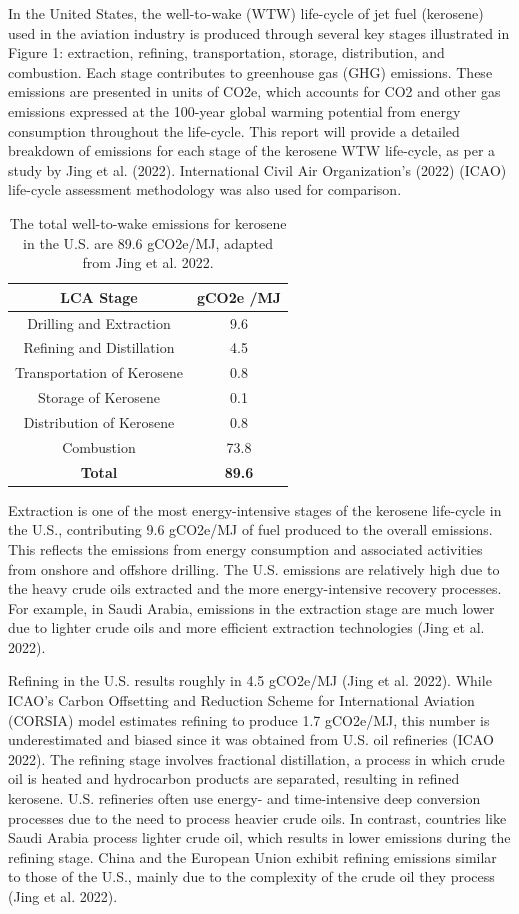 \documentclass[12pt]{article}
\begin{document}
\begin{Appendix}
In the United States, the well-to-wake (WTW) life-cycle of jet fuel (kerosene) used in the aviation industry is produced through several key stages illustrated in Figure 1: extraction, refining, transportation, storage, distribution, and combustion. Each stage contributes to greenhouse gas (GHG) emissions. These emissions are presented in units of CO2e, which accounts for CO2 and other gas emissions expressed at the 100-year global warming potential from energy consumption throughout the life-cycle. This report will provide a detailed breakdown of emissions for each stage of the kerosene WTW life-cycle, as per a study by Jing et al. (2022). International Civil Air Organization’s (2022) (ICAO) life-cycle assessment methodology was also used for comparison. 
\begin{table}[h!]
\centering
\begin{tabular}{|c|c|}
\hline
\textbf{LCA Stage} & \textbf{gCO2e /MJ} \\
\hline
Drilling and Extraction & 9.6 \\
Refining and Distillation & 4.5 \\
Transportation of Kerosene & 0.8 \\
Storage of Kerosene & 0.1 \\
Distribution of Kerosene & 0.8 \\
Combustion & 73.8 \\
\hline
\textbf{Total} & \textbf{89.6} \\
\hline
\end{tabular}
\caption{The total well-to-wake emissions for kerosene in the U.S. are 89.6 gCO2e/MJ, adapted from Jing et al. 2022.}
\label{tab:kerosene_emissions}
\end{table}

Extraction is one of the most energy-intensive stages of the kerosene life-cycle in the U.S., contributing 9.6 gCO2e/MJ of fuel produced to the overall emissions. This reflects the emissions from energy consumption and associated activities from onshore and offshore drilling. The U.S. emissions are relatively high due to the heavy crude oils extracted and the more energy-intensive recovery processes. For example, in Saudi Arabia, emissions in the extraction stage are much lower due to lighter crude oils and more efficient extraction technologies (Jing et al. 2022).

Refining in the U.S. results roughly in 4.5 gCO2e/MJ (Jing et al. 2022). While ICAO’s Carbon Offsetting and Reduction Scheme for International Aviation (CORSIA) model estimates refining to produce 1.7 gCO2e/MJ, this number is underestimated and biased since it was obtained from U.S. oil refineries (ICAO 2022). The refining stage involves fractional distillation, a process in which crude oil is heated and hydrocarbon products are separated, resulting in refined kerosene. U.S. refineries often use energy- and time-intensive deep conversion processes due to the need to process heavier crude oils. In contrast, countries like Saudi Arabia process lighter crude oil, which results in lower emissions during the refining stage. China and the European Union exhibit refining emissions similar to those of the U.S., mainly due to the complexity of the crude oil they process (Jing et al. 2022).


\end{Appendix}
\end{document}

